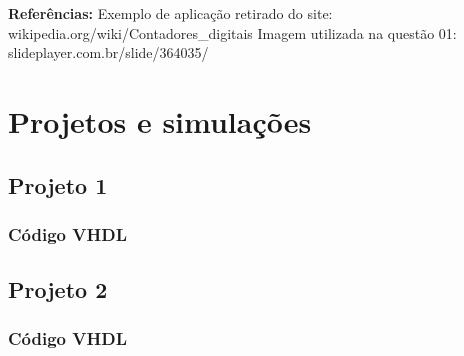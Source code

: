 \documentclass[12pts]{article}
\begin{document}
\singlespacing
\textbf{Referências:}
\singlespacing
Exemplo de aplicação retirado do site: wikipedia.org/wiki/Contadores\_digitais
Imagem utilizada na questão 01: slideplayer.com.br/slide/364035/
\singlespacing

\pagebreak
\section{Projetos e simulações}

\subsection{Projeto 1}


\subsubsection{Código VHDL}
\pagebreak

\subsection{Projeto 2}


\subsubsection{Código VHDL}
\end{document}
